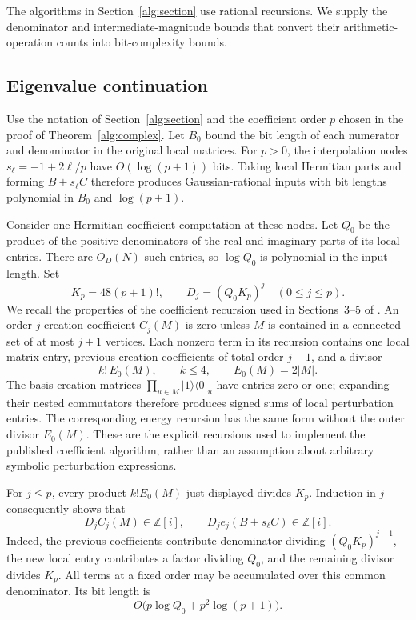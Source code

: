 \documentclass[reqno]{amsart}
\theoremstyle{definition}
\theoremstyle{remark}
\begin{document}
The algorithms in Section~\ref{alg:section} use rational recursions.
We supply the denominator and intermediate-magnitude bounds that
convert their arithmetic-operation counts into bit-complexity bounds.

\subsection{Eigenvalue continuation}\label{alg:energy-bit-details}

Use the notation of Section~\ref{alg:section} and the coefficient
order \(p\) chosen in the proof of Theorem~\ref{alg:complex}.
Let \(B_0\) bound the bit length of each numerator and denominator
in the original local matrices.
For \(p>0\), the interpolation nodes
\(s_\ell=-1+2\ell/p\) have \(O(\log(p+1))\) bits.
Taking local Hermitian parts and forming \(B+s_\ell C\)
therefore produces Gaussian-rational inputs with bit lengths
polynomial in \(B_0\) and \(\log(p+1)\).

Consider one Hermitian coefficient computation at these nodes.
Let \(Q_0\) be the product of the positive denominators of the
real and imaginary parts of its local entries.  There are
\(O_D(N)\) such entries, so \(\log Q_0\) is polynomial in the
input length.  Set
\begin{equation}
 K_p=48(p+1)!,\qquad
 D_j=(Q_0K_p)^j\quad(0\le j\le p).
 \label{alg:common-denominator}
\end{equation}
We recall the properties of the coefficient recursion used in
Sections~3--5 of \cite{BDL08}.  An order-\(j\) creation
coefficient \(C_j(M)\) is zero unless \(M\) is contained in a
connected set of at most \(j+1\) vertices.  Each nonzero term in
its recursion contains one local matrix entry, previous creation
coefficients of total order \(j-1\), and a divisor
\[
 k!\,E_0(M),\qquad k\le4,\qquad E_0(M)=2|M|.
 \]
The basis creation matrices
\(\prod_{u\in M}|1\rangle\langle0|_u\) have entries zero or one;
expanding their nested commutators therefore produces signed sums
of local perturbation entries.
The corresponding energy recursion has the same form without
the outer divisor \(E_0(M)\).
These are the explicit recursions used to implement the published
coefficient algorithm, rather than an assumption about arbitrary
symbolic perturbation expressions.

For \(j\le p\), every product \(k!E_0(M)\) just displayed
divides \(K_p\).  Induction in \(j\) consequently shows that
\begin{equation}
 D_j C_j(M)\in\mathbb Z[i],
 \qquad D_j e_j(B+s_\ell C)\in\mathbb Z[i].
 \label{alg:denominator-induction}
\end{equation}
Indeed, the previous coefficients contribute denominator
dividing \((Q_0K_p)^{j-1}\), the new local entry contributes
a factor dividing \(Q_0\), and the remaining divisor divides
\(K_p\).  All terms at a fixed order may be accumulated over
this common denominator.  Its bit length is
\[
 O\bigl(p\log Q_0+p^2\log(p+1)\bigr).
 \]
\end{document}
